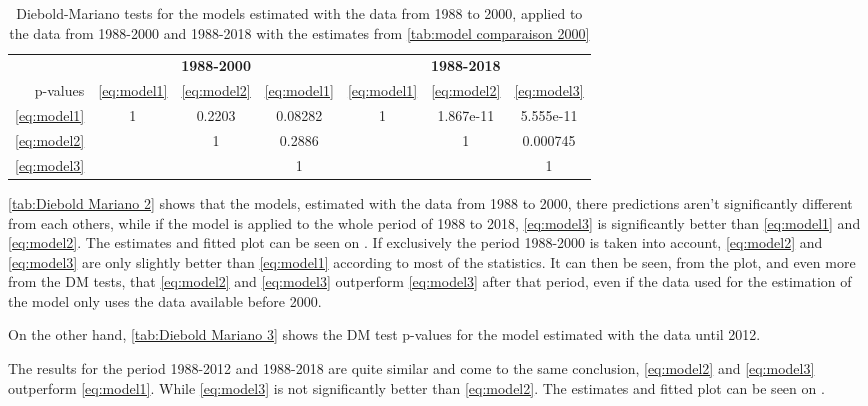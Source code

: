 \documentclass[12pt,a4paper,oneside]{book}
\begin{document}
\begin{table}[htp!]
     \caption{Diebold-Mariano tests for the models estimated with the data from 1988 to 2000, applied to the data from 1988-2000 and 1988-2018 with the estimates from \autoref{tab:model comparaison 2000}}
    \label{tab:Diebold Mariano 2}
    \centering \footnotesize
    \begin{tabular}{| r | c c c | c c c |}
 \multicolumn{1}{r}{} &    \multicolumn{3}{c}{\textbf{1988-2000}} &    \multicolumn{3}{c}{\textbf{1988-2018}} \\ \cline{2-7}
 \multicolumn{0}{r|}{p-values}	& \ref{eq:model1} & \ref{eq:model2} & \ref{eq:model1} & \ref{eq:model1} & \ref{eq:model2} & \ref{eq:model3} \\ \cline{1-7}
 \ref{eq:model1} & 1 & 0.2203 & 0.08282  & 1 & 1.867e-11 & 5.555e-11 \\ 
 \ref{eq:model2} &   & 1  	& 0.2886  	&   & 1 & 0.000745 \\
 \ref{eq:model3} &   &    & 1 &   &   & 1   \\ \cline{1-7}
\end{tabular}
\end{table}

\autoref{tab:Diebold Mariano 2} shows that the models, estimated with the data from 1988 to 2000, there predictions aren't significantly different from each others, while if the model is applied to the whole period of 1988 to 2018, \ref{eq:model3} is significantly better than \ref{eq:model1} and \ref{eq:model2}.
The estimates and fitted plot can be seen on .
If exclusively the period 1988-2000 is taken into account, \ref{eq:model2} and \ref{eq:model3} are only slightly better than \ref{eq:model1} according to most of the statistics.
It can then be seen, from the plot, and even more from the DM tests, that \ref{eq:model2} and \ref{eq:model3} outperform \ref{eq:model3} after that period, even if the data used for the estimation of the model only uses the data available before 2000.


On the other hand, \autoref{tab:Diebold Mariano 3} shows the DM test p-values for the model estimated with the data until 2012. 

The results for the period 1988-2012 and 1988-2018 are quite similar and come to the same conclusion, \ref{eq:model2} and \ref{eq:model3} outperform \ref{eq:model1}. While \ref{eq:model3} is not significantly better than \ref{eq:model2}.
The estimates and fitted plot can be seen on . 
\end{document}
